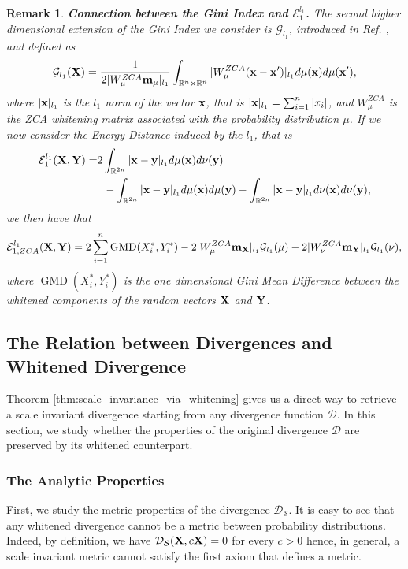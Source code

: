 \documentclass{article}
\newcommand{\R}{\mathbb R}
\def\DDSS{\mathcal{D}_\mathcal{S}}
\def\R{\mathbb{R}}
\def\bx{{\bf x}}
\def\bX{{\bf X}}
\def\bY{{\bf Y}}
\def\by{{\bf y}}
\def\bm{{\bf m}}
\DeclareMathOperator{\GMD}{GMD}
\def \erre{\mathbb{R}}
\newtheorem{remark}{Remark}
\begin{document}
\begin{remark}
    \textbf{Connection between the Gini Index and $\mathcal{E}^{l_1}_1$.} 
    The second higher dimensional extension of the Gini Index we consider is $\mathcal{G}_{l_1}$, introduced in Ref. \cite{AGT}, and defined as
    \begin{equation}
        \mathcal{G}_{l_1}(\bX)=\frac{1}{2|W^{ZCA}_\mu\bm_\mu|_{l_1}}\int_{\erre^n\times\erre^n}|W^{ZCA}_\mu(\bx-\bx')|_{l_1}d\mu(\bx)d\mu(\bx'),
    \end{equation}
    where $|\bx|_{l_1}$ is the $l_1$ norm of the vector $\bx$, that is $|\bx|_{l_1}=\sum_{i=1}^n|x_i|$, and $W^{ZCA}_\mu$ is the ZCA whitening matrix associated with the probability distribution $\mu$.
    If we now consider the Energy Distance induced by the $l_1$, that is
    \begin{align*}
        \mathcal{E}^{l_1}_1(\bX,\bY)=&2\int_{\R^{2n}}|\bx-\by|_{l_1} d\mu(\bx) d\nu(\by)\\
        &\;\;- \int_{\R^{2n}}|\bx-\by|_{l_1} d\mu(\bx) d\mu(\by) - \int_{\R^{2n}}|\bx-\by|_{l_1} d\nu(\bx) d\nu(\by),
    \end{align*}
    we then have that
    \begin{equation}
        \mathcal{E}^{l_1}_{1,ZCA}(\bX,\bY)=2\sum_{i=1}^n\GMD(X^*_i,Y^*_i)-2|W_\mu^{ZCA}\bm_\bX|_{l_1}\mathcal{G}_{l_1}(\mu)-2|W_\nu^{ZCA}\bm_\bY|_{l_1}\mathcal{G}_{l_1}(\nu),
    \end{equation}
    where $\GMD(X^*_i,Y^*_i)$ is the one dimensional Gini Mean Difference between the whitened components of the random vectors $\bX$ and $\bY$.
\end{remark}




\subsection{The Relation between Divergences and Whitened Divergence}

% 
Theorem \ref{thm:scale_invariance_via_whitening} gives us a direct way to retrieve a scale invariant divergence starting from any divergence function $\mathcal{D}$.
% 
In this section, we study whether the properties of the original divergence $\mathcal{D}$ are preserved by its whitened counterpart.
% 

\subsubsection{The Analytic Properties}

% 
First, we study the metric properties of the divergence $\DDSS$.
% 
It is easy to see that any whitened divergence cannot be a metric between probability distributions.
% 
% 
Indeed, by definition, we have $\DDSS(\bX,c\bX)=0$ for every $c>0$ hence,
% 
% 
in general, a scale invariant metric cannot satisfy the first axiom that defines a metric.
% 
\end{document}
